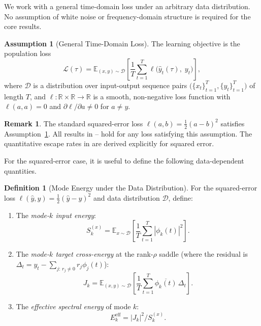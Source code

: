 \documentclass[11pt,a4paper]{article}
\theoremstyle{definition}
\newtheorem{definition}[theorem]{Definition}
\newtheorem{remark}[theorem]{Remark}
\newtheorem{assumption}[theorem]{Assumption}
\newcommand{\R}{\mathbb{R}}
\newcommand{\E}{\mathbb{E}}
\newcommand{\cL}{\mathcal{L}}
\newcommand{\cD}{\mathcal{D}}
\begin{document}
We work with a general time-domain loss under an arbitrary data
distribution. No assumption of white noise or frequency-domain
structure is required for the core results.

\begin{assumption}[General Time-Domain Loss]\label{ass:loss}
The learning objective is the population loss
\begin{equation}\label{eq:loss}
  \cL(\tau)
  = \E_{(x, y) \sim \cD}\!\left[
    \frac{1}{T}\sum_{t=1}^{T}
    \ell\!\bigl(\hat{y}_t(\tau),\; y_t\bigr)
  \right],
\end{equation}
where $\cD$ is a distribution over input-output sequence pairs
$\bigl(\{x_t\}_{t=1}^T, \{y_t\}_{t=1}^T\bigr)$ of length $T$,
and $\ell:\R\times\R\to\R$ is a smooth, non-negative loss
function with $\ell(a,a) = 0$ and
$\partial\ell/\partial a \neq 0$ for $a \neq y$.
\end{assumption}

\begin{remark}
The standard squared-error loss $\ell(a,b) = \tfrac{1}{2}(a-b)^2$
satisfies Assumption~\ref{ass:loss}. All results in
-- hold for any loss
satisfying this assumption. The quantitative escape rates in
 are derived explicitly for squared error.
\end{remark}

\noindent
For the squared-error case, it is useful to define the following
data-dependent quantities.

\begin{definition}[Mode Energy under the Data Distribution]%
\label{def:mode_energy}
For the squared-error loss
$\ell(\hat{y}, y) = \tfrac{1}{2}(\hat{y}-y)^2$ and data
distribution $\cD$, define:
\begin{enumerate}[label=(\roman*)]
  \item The \emph{mode-$k$ input energy}:
    \begin{equation}\label{eq:input_energy}
      S_k^{(x)} = \E_{x \sim \cD}\!\left[
        \frac{1}{T}\sum_{t=1}^T |\phi_k(t)|^2
      \right].
    \end{equation}
  \item The \emph{mode-$k$ target cross-energy} at the rank-$\rho$
    saddle (where the residual is
    $\Delta_t = y_t - \sum_{j:\, r_j \neq 0} r_j \phi_j(t)$):
    \begin{equation}\label{eq:cross_energy}
      J_k = \E_{(x,y)\sim\cD}\!\left[
        \frac{1}{T}\sum_{t=1}^T \overline{\phi_k(t)}\,\Delta_t
      \right].
    \end{equation}
  \item The \emph{effective spectral energy} of mode $k$:
    \begin{equation}\label{eq:eff_energy}
      E_k^{\mathrm{eff}} = |J_k|^2 / S_k^{(x)}.
    \end{equation}
\end{enumerate}
\end{definition}
\end{document}
